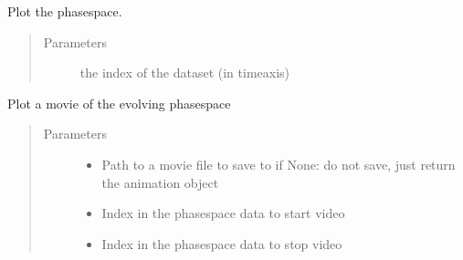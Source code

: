 \documentclass[letterpaper,10pt,openany,oneside,english]{sphinxmanual}
\begin{document}
\begin{fulllineitems}
\begin{fulllineitems}
\label{\detokenize{plots:plots.PhaseSpace.plot_ps}}
Plot the phasespace.
\begin{quote}\begin{description}
\item[{Parameters}] \leavevmode
{} \textendash{} the index of the dataset (in timeaxis)

\end{description}\end{quote}

\end{fulllineitems}


\begin{fulllineitems}
\label{\detokenize{plots:plots.PhaseSpace.center_of_mass}}
\end{fulllineitems}


\begin{fulllineitems}
\label{\detokenize{plots:plots.PhaseSpace.phase_space_movie}}
Plot a movie of the evolving phasespace
\begin{quote}\begin{description}
\item[{Parameters}] \leavevmode\begin{itemize}
\item {} 
 \textendash{} Path to a movie file to save to if None: do not save, just return the  
animation object

\item {} 
 \textendash{} Index in the phasespace data to start video

\item {} 
 \textendash{} Index in the phasespace data to stop video


\end{itemize}
\end{description}
\end{quote}
\end{fulllineitems}
\end{fulllineitems}
\end{document}
